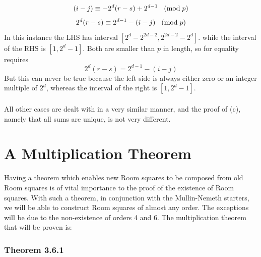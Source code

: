 \documentclass[
  12pt,
  a4paper]{book}
\begin{document}
\[(i-j) \equiv -2^{d}(r-s)+2^{d-1}
\hspace{0.3cm} (\mathrm{mod} \hspace{0.1cm} p)\]
\[2^d(r-s) \equiv 2^{d-1}-(i-j)
\hspace{0.3cm} (\mathrm{mod} \hspace{0.1cm} p)\] In this instance the
LHS has interval \([2^d-2^{2d-2},2^{2d-2}-2^d]\). while the interval of
the RHS is \([1,2^d-1]\). Both are smaller than \(p\) in length, so for
equality requires \[2^d(r-s) = 2^{d-1}-(i-j)\] But this can never be
true because the left side is always either zero or an integer multiple
of \(2^d\), whereas the interval of the right is \([1,2^d-1]\).\\
~\\
All other cases are dealt with in a very similar manner, and the proof
of (c), namely that all sums are unique, is not very different.

\hypertarget{a-multiplication-theorem}{%
\section{A Multiplication Theorem}\label{a-multiplication-theorem}}

Having a theorem which enables new Room squares to be composed from old
Room squares is of vital importance to the proof of the existence of
Room squares. With such a theorem, in conjunction with the Mullin-Nemeth
starters, we will be able to construct Room squares of almost any order.
The exceptions will be due to the non-existence of orders 4 and 6. The
multiplication theorem that will be proven is:

\hypertarget{theorem-3.6.1}{%
\subsubsection{Theorem 3.6.1}\label{theorem-3.6.1}}
\end{document}
